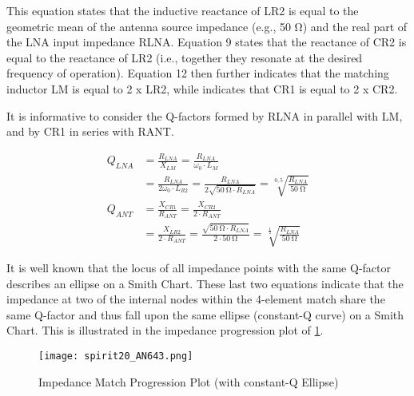         This equation states that the inductive reactance of LR2 is equal to the geometric mean of 
        the antenna source impedance (e.g., 50 Ω) and the real part of the LNA input impedance 
        RLNA. Equation 9 states that the reactance of CR2 is equal to the reactance of LR2 (i.e., 
        together they resonate at the desired frequency of operation). Equation 12 then further 
        indicates that the matching inductor LM is equal to 2 x LR2, while indicates that CR1 is 
        equal to 2 x CR2.
        
        It is informative to consider the Q-factors formed by RLNA in parallel with LM, and by CR1 
        in series with RANT.
        
        \begin{align}
          Q_{LNA} &= \frac{R_{LNA}}{X_{LM}} 
                   = \frac{R_{LNA}}{\omega_0\cdot L_{M}}    \nonumber \\
                  &= \frac{R_{LNA}}{2\omega_0\cdot L_{R2}} 
                   = \frac{R_{LNA}}{2\sqrt{\SI{50}{\ohm}\cdot R_{LNA}}}
                   = \sqrt[0,5]{\frac{R_{LNA}}{\SI{50}{\ohm}}}        \label{EXP001:eq_spirit27} \\ 
          Q_{ANT} &= \frac{X_{CR1}}{R_{ANT}} 
                   = \frac{X_{CR2}}{2\cdot R_{ANT}}         \nonumber \\
                  &= \frac{X_{LR2}}{2\cdot R_{ANT}} 
                   = \frac{\sqrt{\SI{50}{\ohm}\cdot R_{LNA}}}{2\cdot \SI{50}{\ohm}}
                   = \sqrt[\frac{1}{2}]{\frac{R_{LNA}}{\SI{50}{\ohm}}}  \label{EXP001:eq_spirit28}  
        \end{align}
        
        It is well known that the locus of all impedance points with the same Q-factor describes an 
        ellipse on a Smith Chart. These last two equations indicate that the impedance at two of 
        the internal nodes within the 4-element match share the same Q-factor and thus fall upon 
        the same ellipse (constant-Q curve) on a Smith Chart. This is illustrated in the impedance 
        progression plot of 
        \ref{EXP001:fig_spirit20}.
        
        \begin{figure}[ht!] %
          \centering
          \texttt{[image: spirit20\_AN643.png]}
          \caption{Impedance Match Progression Plot (with constant-Q Ellipse) \cite[s.~18]{AN643SiliconLabs}}
          \label{EXP001:fig_spirit20}
        \end{figure}
        
